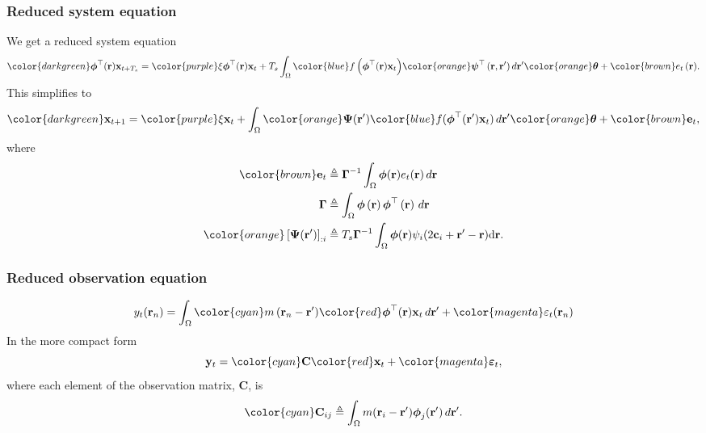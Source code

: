 \documentclass[compress]{beamer}
\begin{document}
\begin{frame}\frametitle{Reduced system equation}
We get a reduced system equation
\begin{equation}
	{\color{darkgreen}\boldsymbol{\phi}^{\top}(\mathbf{r})\mathbf{x}_{t+T_s}} = 
	{\color{purple}\xi \boldsymbol{\phi}^{\top}(\mathbf{r})\mathbf{x}_{t}} + 
	T_s \int_\Omega { 
	    {\color{blue}f\left(\boldsymbol{\phi}^{\top}(\mathbf{r})\mathbf{x}_{t}\right)} 
		{\color{orange}\boldsymbol\psi^{\top}\left(\mathbf{r},\mathbf{r}'\right)}
	\, d\mathbf{r}'} {\color{orange}\boldsymbol\theta}
	+ {\color{brown}e_t\left(\mathbf{r}\right)}.
\end{equation}
\pause
This simplifies to
\begin{align}
	{\color{darkgreen}\mathbf{x}_{t+1}} = {\color{purple}\xi\mathbf{x}_t} 
+ \int_\Omega {\color{orange}\boldsymbol{\Psi}(\mathbf{r}')} {\color{blue}f(\boldsymbol{\phi}^{\top}(\mathbf{r}')\mathbf{x}_t)} \, d\mathbf{r}' {\color{orange}\boldsymbol{\theta}} + {\color{brown}\mathbf{e}_t},
\end{align}
\pause
where
\begin{align}
	\color{brown}\mathbf{e}_t &\triangleq \boldsymbol{\Gamma}^{-1}\int_\Omega {\boldsymbol{\phi} ( \mathbf{r} )e_t( \mathbf{r} ) \, d\mathbf{r}} \\
	\boldsymbol{\Gamma} &\triangleq \int_\Omega {\boldsymbol{\phi} \left(\mathbf{r}\right)\boldsymbol{\phi} ^{\top}\left(\mathbf{r}\right) \, d\mathbf{r}} \\
	\color{orange}\left[ \boldsymbol\Psi(\mathbf{r}')\right]_{:i}  &\triangleq T_s\boldsymbol{\Gamma}^{-1}\int_\Omega {\boldsymbol{\phi}(\mathbf{r})\psi_i (2\mathbf{c}_i+\mathbf{r}'-\mathbf{r})\textrm{d}\mathbf{r}}.
\end{align}
\end{frame}

\begin{frame}\frametitle{Reduced observation equation}
	\begin{equation}
		y_t(\mathbf{r}_n) = \int_{\Omega} { {\color{cyan}m\left(\mathbf{r}_n-\mathbf{r}'\right)} {\color{red}\boldsymbol{\phi}^{\top}(\mathbf{r})\mathbf{x}_{t}} \, d\mathbf{r}'} + {\color{magenta}\varepsilon_t(\mathbf{r}_n)} 
	\end{equation}
\pause
In the more compact form
\begin{equation}\label{ObservationEquation} 
	\mathbf{y}_t = {\color{cyan}\mathbf{C}}{\color{red}\mathbf{x}_t} + {\color{magenta}\boldsymbol{\varepsilon}_t},
\end{equation}
\pause
where each element of the observation matrix, $\mathbf{C}$, is 
\begin{equation}
	{\color{cyan}\mathbf{C}_{ij}} \triangleq \int_{\Omega}m(\mathbf{r}_i - \mathbf{r}')\boldsymbol{\phi}_j(\mathbf{r}') \, d\mathbf{r}'.
\end{equation}
\end{frame}
	
\end{document}
